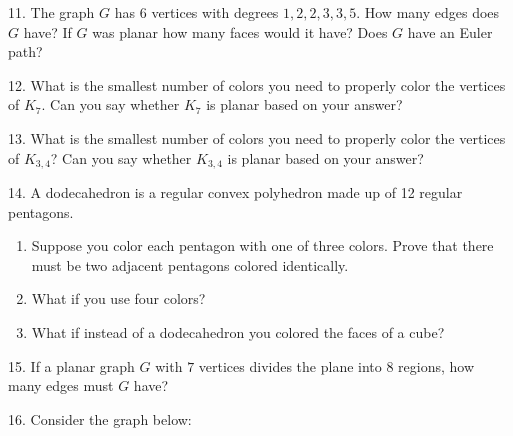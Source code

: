 \documentclass[10pt,]{book}
\theoremstyle{plain}
\theoremstyle{definition}
\theoremstyle{definition}
\theoremstyle{definition}
\numberwithin{equation}{chapter}
\newcommand{\vtx}[2]{node[fill,circle,inner sep=0pt, minimum size=4pt,label=#1:#2]{}}
\renewcommand{\v}{\vtx{above}{}}
\begin{document}
\begin{exerciselist}
\par\smallskip
\item[11.]\hypertarget{exercise-304}{}
            The graph \(G\) has 6 vertices with degrees \(1, 2, 2, 3, 3, 5\). How many edges does \(G\) have? If \(G\) was planar how many faces would it have? Does \(G\) have an Euler path?
\par\smallskip
\item[12.]\hypertarget{exercise-305}{}
            What is the smallest number of colors you need to properly color the vertices of \(K_{7}\). Can you say whether \(K_7\) is planar based on your answer?
\par\smallskip
\item[13.]\hypertarget{exercise-306}{}
            What is the smallest number of colors you need to properly color the vertices of \(K_{3,4}\)? Can you say whether \(K_{3,4}\) is planar based on your answer?
\par\smallskip
\item[14.]\hypertarget{exercise-307}{}
            A dodecahedron is a regular convex polyhedron made up of 12 regular pentagons.
\leavevmode%
\begin{enumerate}[label=(\alph*)]
\item\hypertarget{li-1259}{}
                Suppose you color each pentagon with one of three colors. Prove that there must be two adjacent pentagons colored identically.
\item\hypertarget{li-1260}{}
                What if you use four colors?
\item\hypertarget{li-1261}{}
                What if instead of a dodecahedron you colored the faces of a cube?
\end{enumerate}
\par\smallskip
\item[15.]\hypertarget{exercise-308}{}
            If a planar graph \(G\) with \(7\) vertices divides the plane into 8 regions, how many edges must \(G\) have?
\par\smallskip
\item[16.]\hypertarget{exercise-309}{}
            Consider the graph below:
\leavevmode%
\begin{figure}
\centering
{
            }
\end{figure}
\end{exerciselist}
\end{document}

